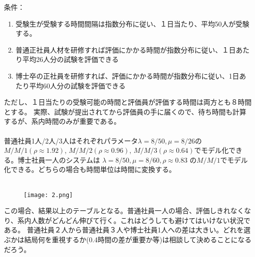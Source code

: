 \documentclass{report}
\begin{document}
\begin{CJK}{UTF8}{min}
    条件：
    \begin{enumerate}
        \item 受験生が受験する時間間隔は指数分布に従い、１日当たり、平均50人が受験する。
        \item 普通正社員人材を研修すれば評価にかかる時間が指数分布に従い、１日あたり平均26人分の試験を評価できる
        \item 博士卒の正社員を研修すれば、評価にかかる時間が指数分布に従い、1日あたり平均60人分の試験を評価できる
    \end{enumerate}
    ただし、１日当たりの受験可能の時間と評価員が評価する時間は両方とも８時間とする。
    実際、試験が提出されてから評価員の手に届くので、待ち時間も計算するが、系内時間のみが重要である。\\　\\
    普通社員1人/2人/3人はそれぞれパラメータ$\lambda=8/50,\mu=8/26$の$M/M/1 (\rho\approx1.92)$, $M/M/2(\rho\approx0.96)$, $M/M/3(\rho\approx0.64)$でモデル化できる。博士社員一人のシステムは
    $\lambda=8/50,\mu=8/60,\rho\approx0.83$ の$M/M/1$でモデル化できる。どちらの場合も時間単位は時間に変換する。\\ \\

    \begin{figure}[h!t]
        \centerline{\texttt{[image: 2.png]}}
    \end{figure}
    この場合、結果以上のテーブルとなる。普通社員一人の場合、評価しきれなくなり、系内人数がどんどん伸びて行く。これはどうしても避けてはいけない状況である。
    普通社員２人から普通社員３人や博士社員1人への差は大きい。どれを選ぶかは結局何を重視するか(0.4時間の差が重要か等)は相談して決めることになるだろう。

\end{CJK}
\end{document}
